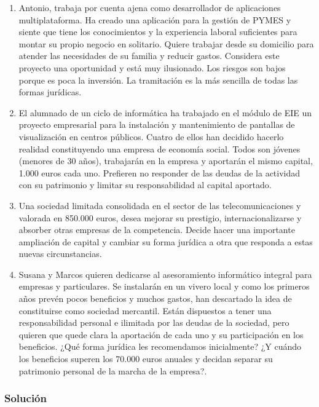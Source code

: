 \begin{enumerate}[label=\alph*)]
    \item Antonio, trabaja por cuenta ajena como desarrollador de aplicaciones multiplataforma. Ha creado una aplicación para la gestión de PYMES y siente que tiene los conocimientos y la experiencia laboral suficientes para montar su propio negocio en solitario. Quiere trabajar desde su domicilio para atender las necesidades de su familia y reducir gastos. Considera este proyecto una oportunidad y está muy ilusionado. Los riesgos son bajos porque es poca la inversión. La tramitación es la más sencilla de todas las formas jurídicas.

    \item El alumnado de un ciclo de informática ha trabajado en el módulo de EIE un proyecto empresarial para la instalación y mantenimiento de pantallas de visualización en centros públicos. Cuatro de ellos han decidido hacerlo realidad constituyendo una empresa de economía social. Todos son jóvenes (menores de 30 años), trabajarán en la empresa y aportarán el mismo capital, 1.000 euros cada uno. Prefieren no responder de las deudas de la actividad con su patrimonio y limitar su responsabilidad al capital aportado.

    \item Una sociedad limitada consolidada en el sector de las telecomunicaciones y valorada en 850.000 euros, desea mejorar su prestigio, internacionalizarse y absorber otras empresas de la competencia. Decide hacer una importante ampliación de capital y cambiar su forma jurídica a otra que responda a estas nuevas circunstancias.

    \item Susana y Marcos quieren dedicarse al asesoramiento informático integral para empresas y particulares. Se instalarán en un vivero local y como los primeros años prevén pocos beneficios y muchos gastos, han descartado la idea de constituirse como sociedad mercantil. Están dispuestos a tener una responsabilidad personal e ilimitada por las deudas de la sociedad, pero quieren que quede clara la aportación de cada uno y su participación en los beneficios. ¿Qué forma jurídica les recomendamos inicialmente? ¿Y cuándo los beneficios superen los 70.000 euros anuales y decidan separar su patrimonio personal de la marcha de la empresa?.
\end{enumerate}

\subsubsection{Solución}


